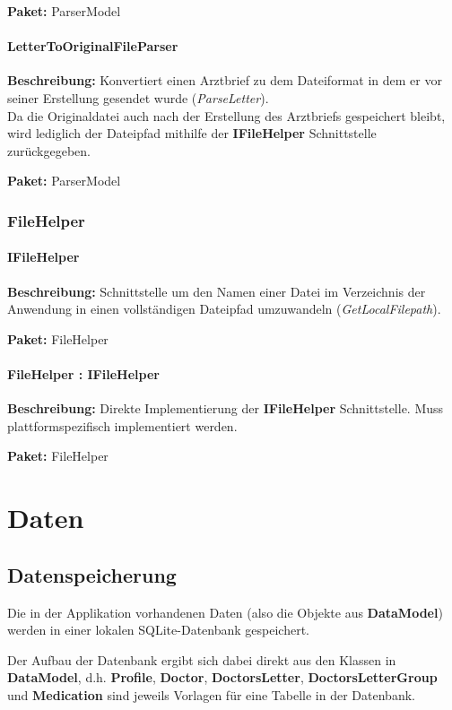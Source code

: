 \documentclass[a4paper]{scrreprt}
\begin{document}
\textbf{Paket:} ParserModel

\subsubsection{LetterToOriginalFileParser}
\textbf{Beschreibung:} Konvertiert einen Arztbrief zu dem Dateiformat in dem er vor seiner Erstellung gesendet wurde (\textit{ParseLetter}).\\
Da die Originaldatei auch nach der Erstellung des Arztbriefs gespeichert bleibt, wird lediglich der Dateipfad mithilfe der \textbf{IFileHelper} Schnittstelle zurückgegeben.

\textbf{Paket:} ParserModel

\subsection{FileHelper}
\subsubsection{IFileHelper}
\textbf{Beschreibung:} Schnittstelle um den Namen einer Datei im Verzeichnis der Anwendung in einen vollständigen Dateipfad umzuwandeln (\textit{GetLocalFilepath}).

\textbf{Paket:} FileHelper

\subsubsection{FileHelper : IFileHelper}
\textbf{Beschreibung:} Direkte Implementierung der \textbf{IFileHelper} Schnittstelle. Muss plattformspezifisch implementiert werden.

\textbf{Paket:} FileHelper


\chapter{Daten}
\section{Datenspeicherung}
Die in der Applikation vorhandenen Daten (also die Objekte aus \textbf{DataModel}) werden in einer lokalen SQLite-Datenbank gespeichert. 

Der Aufbau der Datenbank ergibt sich dabei direkt aus den Klassen in \textbf{DataModel}, d.h. \textbf{Profile}, \textbf{Doctor}, \textbf{DoctorsLetter}, \textbf{DoctorsLetterGroup} und \textbf{Medication} sind jeweils Vorlagen für eine Tabelle in der Datenbank.
\end{document}
